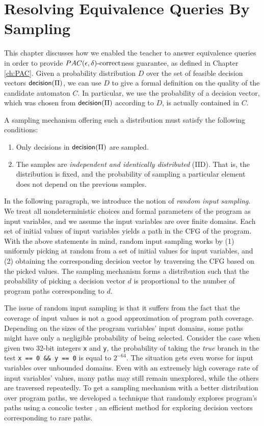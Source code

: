 \chapter{Resolving Equivalence Queries By Sampling}\label{ch:eq}

This chapter discusses how we enabled the teacher to answer equivalence queries in order to provide $PAC(\epsilon, \delta)\text{-correct}$ness guarantee, as defined in Chapter \ref{ch:PAC}. Given a probability distribution $D$ over the set of feasible decision vectors $\mathsf{decision}(\Pi)$, we can use $D$ to give a formal definition on the quality of the candidate automaton $C$. In particular, we use the probability of a decision vector, which was chosen from $\mathsf{decision}(\Pi)$ according to $D$, is actually contained in $C$. 

A sampling mechanism offering such a distribution must satisfy the following conditions: 
\begin{enumerate}
	\item Only decisions in $\mathsf{decision}(\Pi)$ are sampled.\label{item:sample_cond_1}
	\item The samples are \emph{independent and identically distributed} (IID). That is, the distribution is fixed, and the probability of sampling a particular element does not depend on the previous samples. \label{item:sample_cond_2}
\end{enumerate}
In the following paragraph, we introduce the notion of \emph{random input sampling}. We treat all nondeterministic choices and formal parameters of the program as input variables, and we assume the input variables are over finite domains. Each set of initial values of input variables yields a path in the CFG of the program. With the above statements in mind, random input sampling works by (1) uniformly picking at random from a set of initial values for input variables, and (2) obtaining the corresponding decision vector by traversing the CFG based on the picked values. The sampling mechanism forms a distribution such that the probability of picking a decision vector $d$ is proportional to the number of program paths corresponding to $d$. 

The issue of random input sampling is that it suffers from the fact that the coverage of input values is not a good approximation of program path coverage. Depending on the sizes of the program variables' input domains, some paths might have only a negligible probability of being selected. Consider the case when given two 32-bit integers  \texttt{x} and \texttt{y}, the probability of taking the \textit{true} branch in the test \lstinline|x == 0 && y == 0| is equal to $2^{-64}$. The situation gets even worse for input variables over unbounded domains. Even with an extremely high coverage rate of input variables' values, many paths may still remain unexplored, while the others are traversed repeatedly. To get a sampling mechanism with a better distribution over program paths, we developed a technique that randomly explores program's paths using a concolic tester \cite{GodefroidKS05,SenMA05,BurnimS08}, an efficient method for exploring decision vectors corresponding to rare paths. 

